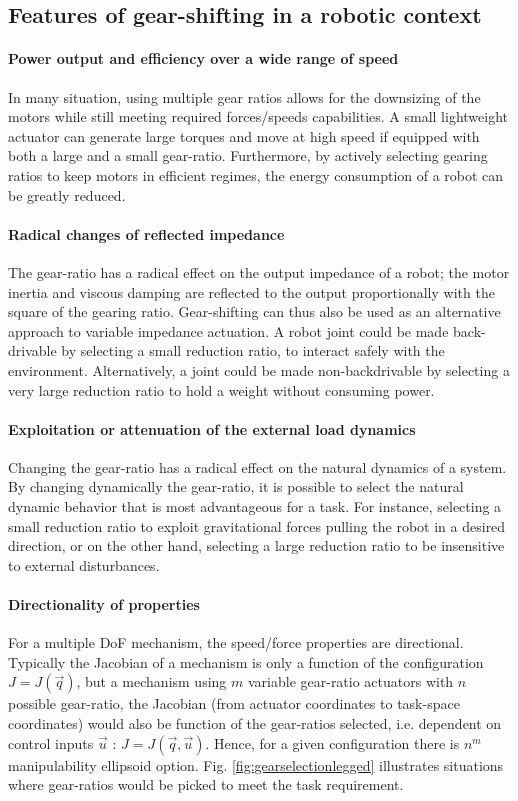 \subsection{Features of gear-shifting in a robotic context}

\paragraph{Power output and efficiency over a wide range of speed}
In many situation, using multiple gear ratios allows for the downsizing of the motors while still meeting required forces/speeds capabilities. A small lightweight actuator can generate large torques and move at high speed if equipped with both a large and a small gear-ratio. Furthermore, by actively selecting gearing ratios to keep motors in efficient regimes, the energy consumption of a robot can be greatly reduced. 

\paragraph{Radical changes of reflected impedance}
The gear-ratio has a radical effect on the output impedance of a robot; the motor inertia and viscous damping are reflected to the output proportionally with the square of the gearing ratio. Gear-shifting can thus also be used as an alternative approach to variable impedance actuation. A robot joint could be made back-drivable by selecting a small reduction ratio, to interact safely with the environment.  Alternatively, a joint could be made non-backdrivable by selecting a very large reduction ratio to hold a weight without consuming power.

\paragraph{Exploitation or attenuation of the external load dynamics}
Changing the gear-ratio has a radical effect on the natural dynamics of a system. By changing dynamically the gear-ratio, it is possible to select the natural dynamic behavior that is most advantageous for a task. For instance, selecting a small reduction ratio to exploit gravitational forces pulling the robot in a desired direction, or on the other hand, selecting a large reduction ratio to be insensitive to external disturbances.

\paragraph{Directionality of properties}
For a multiple DoF mechanism, the speed/force properties are directional. Typically the Jacobian of a mechanism is only a function of the configuration $J=J(\vec{q})$, but a mechanism using $m$ variable gear-ratio actuators with $n$ possible gear-ratio, the Jacobian (from actuator coordinates to task-space coordinates) would also be function of the gear-ratios selected, i.e. dependent on control inputs $\vec{u}$ : $J=J(\vec{q},\vec{u})$. Hence, for a given configuration there is $n^m$ manipulability ellipsoid option. Fig. \ref{fig:gearselectionlegged} illustrates situations where gear-ratios would be picked to meet the task requirement.


